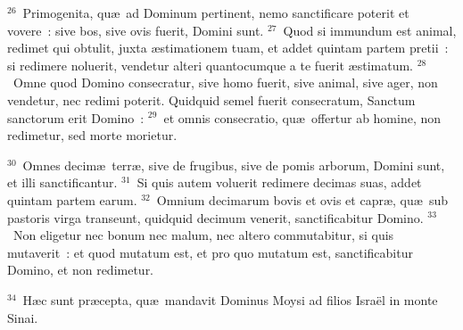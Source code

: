${}^{26}$~Primogenita, qu\ae\ ad Dominum pertinent, nemo sanctificare poterit et vovere~: sive bos, sive ovis fuerit, Domini sunt.
${}^{27}$~Quod si immundum est animal, redimet qui obtulit, juxta \ae stimationem tuam, et addet quintam partem pretii~: si redimere noluerit, vendetur alteri quantocumque a te fuerit \ae stimatum.
${}^{28}$~Omne quod Domino consecratur, sive homo fuerit, sive animal, sive ager, non vendetur, nec redimi poterit. Quidquid semel fuerit consecratum, Sanctum sanctorum erit Domino~:
${}^{29}$~et omnis consecratio, qu\ae\ offertur ab homine, non redimetur, sed morte morietur.


${}^{30}$~Omnes decim\ae\ terr\ae , sive de frugibus, sive de pomis arborum, Domini sunt, et illi sanctificantur.
${}^{31}$~Si quis autem voluerit redimere decimas suas, addet quintam partem earum.
${}^{32}$~Omnium decimarum bovis et ovis et capr\ae , qu\ae\ sub pastoris virga transeunt, quidquid decimum venerit, sanctificabitur Domino.
${}^{33}$~Non eligetur nec bonum nec malum, nec altero commutabitur, si quis mutaverit~: et quod mutatum est, et pro quo mutatum est, sanctificabitur Domino, et non redimetur.


${}^{34}$~H\ae c sunt pr\ae cepta, qu\ae\ mandavit Dominus Moysi ad filios Isra\"el in monte Sinai.
